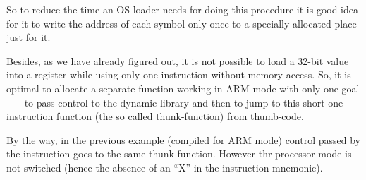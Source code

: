 {So to reduce the time an \ac{OS} loader needs for doing this procedure it is good idea for it to write the address of each symbol only once to a specially allocated place just for it}.

{Besides, as we have already figured out, it is not possible to load a 32-bit value into a register 
while using only one instruction without memory access}.
{So, it is optimal to allocate a separate function working in ARM mode with only one goal ~--- 
to pass control to the dynamic library}
{and then to jump to this short one-instruction function (the so called thunk-function) from thumb-code}.

{By the way, in the previous example (compiled for ARM mode) control passed by the  instruction goes to the same thunk-function.
However thr processor mode is not switched (hence the absence of an ``X'' in the instruction mnemonic)}.

